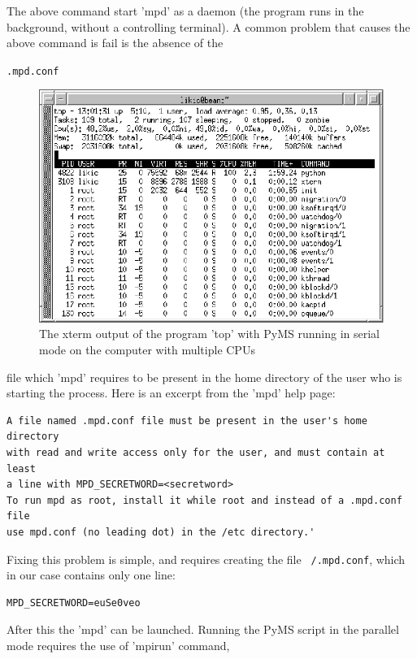 The above command start 'mpd' as a daemon (the program runs in the
background, without a controlling terminal).  A common problem
that causes the above command is fail is the absence of the
{\tt .mpd.conf
\begin{figure}
  \begin{center}
    \includegraphics[scale=1.0]{graphics/chapter08/top-serial.eps}
  \end{center}
  \caption{The xterm output of the program 'top' with PyMS running in
  serial mode on the computer with multiple CPUs}
  \label{fig:top-serial}
\end{figure}
} file which 'mpd' requires to be present in the
home directory of the user who is starting the process. Here is
an excerpt from the 'mpd' help page:

\begin{verbatim}
A file named .mpd.conf file must be present in the user's home directory
with read and write access only for the user, and must contain at least
a line with MPD_SECRETWORD=<secretword>
To run mpd as root, install it while root and instead of a .mpd.conf file
use mpd.conf (no leading dot) in the /etc directory.' 
\end{verbatim}

Fixing this problem is simple, and requires creating the file
{\tt ~/.mpd.conf}, which in our case contains only one line:

\begin{verbatim}
MPD_SECRETWORD=euSe0veo
\end{verbatim}

After this the 'mpd' can be launched.  Running the PyMS script in the parallel
mode requires the use of 'mpirun' command,


